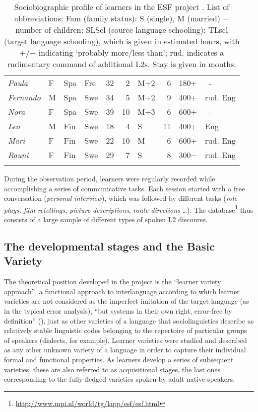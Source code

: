 \documentclass[output=paper]{langscibook}
\begin{document}
\begin{table}
\begin{tabularx}{\textwidth}{llllrrlrrQ}
{\itshape Paula}  &  F &  Spa &  Fre &  32 &  2 & M+2 &  6 &  180+ & ~-\\
{\itshape Fernando} &  M &  Spa &  Swe &  34 &  5 & M+2 &  9 &  400+ & rud. Eng\\
{\itshape Nora} &  F &  Spa &  Swe &  39 &  10 & M+3 &  6 &  600+ & ~-\\
{\itshape Leo} &  M &  Fin &  Swe &  18 &  4 & S &  11 &  400+ & Eng\\
{\itshape Mari} &  F &  Fin &  Swe &  22 &  10 & M &  6 &  600+ & rud. Eng\\
{\itshape Rauni} &  F &  Fin &  Swe &  29 &  7 & S &  8 &  300− & rud. Eng\\
\lspbottomrule
\end{tabularx}
\caption{\label{tab:benazzo:1}Sociobiographic profile of learners in the ESF project \citep[46]{Perdue1993vol1}. List of abbreviations: Fam (family status): S (single), M (married) + number of children; SLScl (source language schooling); TLscl (target language schooling), which is given in estimated hours, with +/− indicating ‘probably more/less than’; rud. indicates a rudimentary command of additional L2s. Stay is given in months.}
\end{table}


During the observation period, learners were regularly recorded while accomplishing a series of communicative tasks. Each session started with a free conversation (\textit{personal interview}), which was followed by different tasks (\textit{role plays, film retellings, picture descriptions}, \textit{route directions} …). The database\footnote{\url{http://www.mpi.nl/world/tg/lapp/esf/esf.html}} thus consists of a large sample of different types of spoken L2 discourse. 

\subsection{The developmental stages and the Basic Variety} \label{sec:benazzo:2.2}
\begin{sloppypar}
The theoretical position developed in the project is the “learner variety approach”, a functional approach to interlanguage according to which learner varieties are not considered as the imperfect imitation of the target language (as in the typical error analysis), “but systems in their own right, error-free by definition” (\citealt[308]{KleinPerdue1997}), just as other varieties of a language that sociolinguistics describe as relatively stable linguistic codes belonging to the repertoire of particular groups of speakers (dialects, for example). Learner varieties were studied and described as any other unknown variety of a language in order to capture their individual formal and functional properties. As learners develop a series of subsequent varieties, these are also referred to as acquisitional stages, the last ones corresponding to the fully-fledged varieties spoken by adult native speakers.
\end{sloppypar}
\end{document}
